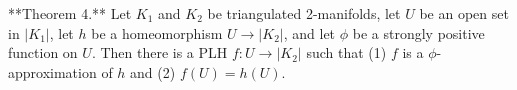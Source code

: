 **Theorem 4.** Let $K_1$ and $K_2$ be triangulated 2-manifolds, let $U$ be an open set in $|K_1|$, let $h$ be a homeomorphism $U \rightarrow |K_2|$, and let $\phi$ be a strongly positive function on $U$. Then there is a PLH $f: U \rightarrow |K_2|$ such that (1) $f$ is a $\phi$-approximation of $h$ and (2) $f(U) = h(U)$.
